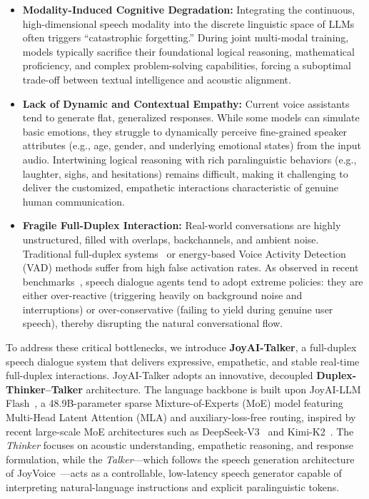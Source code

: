 \begin{itemize}
    \item \textbf{Modality-Induced Cognitive Degradation:} Integrating the continuous, high-dimensional speech modality into the discrete linguistic space of LLMs often triggers ``catastrophic forgetting.'' During joint multi-modal training, models typically sacrifice their foundational logical reasoning, mathematical proficiency, and complex problem-solving capabilities, forcing a suboptimal trade-off between textual intelligence and acoustic alignment.
    
    \item \textbf{Lack of Dynamic and Contextual Empathy:} Current voice assistants tend to generate flat, generalized responses. While some models can simulate basic emotions, they struggle to dynamically perceive fine-grained speaker attributes (e.g., age, gender, and underlying emotional states) from the input audio. Intertwining logical reasoning with rich paralinguistic behaviors (e.g., laughter, sighs, and hesitations) remains difficult, making it challenging to deliver the customized, empathetic interactions characteristic of genuine human communication.
    
    \item \textbf{Fragile Full-Duplex Interaction:} Real-world conversations are highly unstructured, filled with overlaps, backchannels, and ambient noise. Traditional full-duplex systems~\cite{defossez2024moshi} or energy-based Voice Activity Detection (VAD) methods suffer from high false activation rates. As observed in recent benchmarks~\cite{lin2026fullduplexv1.5}, speech dialogue agents tend to adopt extreme policies: they are either over-reactive (triggering heavily on background noise and interruptions) or over-conservative (failing to yield during genuine user speech), thereby disrupting the natural conversational flow.
\end{itemize}




To address these critical bottlenecks, we introduce \textbf{JoyAI-Talker}, a full-duplex speech dialogue system that delivers expressive, empathetic, and stable real-time full-duplex interactions. JoyAI-Talker adopts an innovative, decoupled \textbf{Duplex-Thinker--Talker} architecture. The language backbone is built upon JoyAI-LLM Flash~\cite{cai2026joyaillmflashadvancingmidscale}, a 48.9B-parameter sparse Mixture-of-Experts (MoE) model featuring Multi-Head Latent Attention (MLA) and auxiliary-loss-free routing, inspired by recent large-scale MoE architectures such as DeepSeek-V3~\cite{deepseekai2025deepseekv3technicalreport} and Kimi-K2~\cite{kimiteam2026kimik2openagentic}. The \textit{Thinker} focuses on acoustic understanding, empathetic reasoning, and response formulation, while the \textit{Talker}—which follows the speech generation architecture of JoyVoice~\cite{joyvoice}—acts as a controllable, low-latency speech generator capable of interpreting natural-language instructions and explicit paralinguistic tokens.



